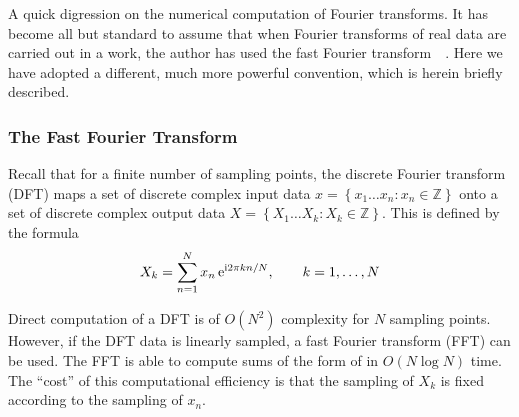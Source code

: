 A quick digression on the numerical computation of Fourier transforms.  It
has become all but standard to assume that when Fourier transforms of real
data are carried out in a work, the author has used the fast Fourier
transform~\cite{frigo1998fftw}~\cite{cooley1965algorithm}.  Here we
have adopted a different, much more powerful convention, which is herein briefly
described.

\subsubsection{The Fast Fourier Transform}
Recall that for a finite number of sampling points, the discrete
Fourier transform (DFT) maps a set of discrete complex input data
$x = \left\{x_1\dots x_n : x_n\in\mathbb{Z}\right\}$ onto a set of
discrete complex output data $X =
\left\{X_1\dots X_k : X_k\in\mathbb{Z}\right\}$.  This is defined by the
formula
\begin{equation}
X_k = \sum_{n=1}^{N} x_n\, {\mathrm{e}}^{{\mathrm{i}} 2\pi k n/N}, \qquad k=1,\ldots,N
\label{eqn:dft}
\end{equation}

Direct computation of a DFT is of $O(N^2)$ complexity for $N$ sampling
points.  However, if the DFT data is linearly sampled, a fast Fourier
transform (FFT) can be used. The FFT is able to compute sums of the form of
 in $O(N \log N)$ time.  The ``cost'' of this
computational efficiency is that the sampling of $X_k$ is fixed
according to the sampling of $x_n$.

